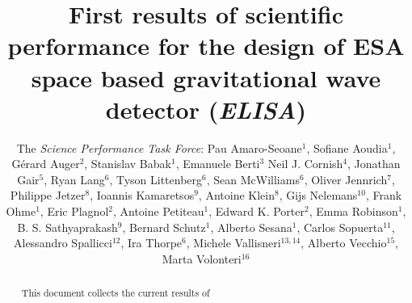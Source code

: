 \documentclass{iopart}
\begin{document}
\title
{First results of scientific performance for the design of ESA space based gravitational wave detector ({\it ELISA}) }

\author{The \emph{Science Performance Task Force}:
Pau Amaro-Seoane$^1$,
Sofiane Aoudia$^1$,
G\'erard Auger$^2$,
Stanislav Babak$^1$,
Emanuele Berti$^3$
Neil J. Cornish$^4$,
Jonathan Gair$^5$,
Ryan Lang$^6$,
Tyson Littenberg$^6$,
Sean McWilliams$^6$,
Oliver Jennrich$^7$,
Philippe Jetzer$^8$,
Ioannis Kamaretsos$^9$,
Antoine Klein$^8$,
Gijs Nelemans$^{10}$,
Frank Ohme$^1$,
Eric Plagnol$^2$,
Antoine Petiteau$^1$,
Edward K. Porter$^2$,
Emma Robinson$^1$,
B. S. Sathyaprakash$^9$,
Bernard Schutz$^1$,
Alberto Sesana$^1$,
Carlos Sopuerta$^{11}$,
Alessandro Spallicci$^{12}$,
Ira Thorpe$^6$,
Michele Vallisneri$^{13,14}$,
Alberto Vecchio$^{15}$,
Marta Volonteri$^{16}$
}

\address{$^1$ Max-Planck-Institut f\"ur Gravitationsphysik (Albert-Einstein-Institut), Am M\"uhlenberg 1, D-14476 Golm bei Potsdam, Germany}
\address{$^2$ APC, UMR 7164, Univ.\ Paris 7 Denis Diderot, 10, rue Alice Domon et Leonie Duquet, 75025 Paris Cedex 13, France}
\address{$^3$ University of Mississippi, USA}
\address{$^4$ Dept.\ of Physics, Montana State Univ., Bozeman, MT 59717, USA}
\address{$^5$ Inst.\ of Astronomy, Univ.\ of Cambridge, Madingley Rd., Cambridge, CB30HA, UK}
\address{$^6$ Gravitational Astrophysics Lab., NASA Goddard Space Flight Center, 8800 Greenbelt Rd., Greenbelt, MD 20771, USA}
\address{$^7$ European Space Agency}
\address{$^8$ Institute of Theoretical Physics, University of Zurich}
\address{$^9$ School of Physics and Astronomy, Cardiff Univ., 5, The Parade, Cardiff, CF243YB, UK}
\address{$^{10}$ Department of Astrophysics, Radboud University Nijmegen, The Netherlands}
\address{$^{11}$ Institute of Space Sciences (ICE-CSIC), Barcelona, Spain}
\address{$^{12}$ University of Orleans, France}
\address{$^{13}$ Jet Propulsion Laboratory, California Inst.\ of Technology, Pasadena, CA 91109, USA}
\address{$^{14}$ Theoretical Astrophysics, California Inst.\ of Technology, Pasadena, CA 91125}
\address{$^{15}$ School of Physics and Astronomy, Univ.\ of Birmingham, Edgbaston, Birmingham B152TT, UK}
\address{$^{16}$ University of Michigan}



\begin{abstract}

This document collects the current results of 

\end{abstract}
\end{document}
